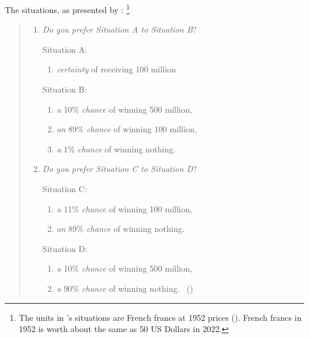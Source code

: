 \begin{note}
  The situations, as presented by \citeauthor{Allais:1979aa}:%
  \footnote{
    The units in \citeauthor{Allais:1979aa}'s situations are French francs at 1952 prices (\citeauthor[138, fn.94]{Allais:1979aa}). French francs in 1952 is worth about the same as 50 US Dollars in 2022.
  }
  \begin{quote}
    \begin{enumerate}[label=(\arabic*), ref=(\arabic*)]
    \item
      \emph{Do you prefer Situation A to Situation B}?

      Situation A:
        \begin{enumerate}[label=--]
        \item
          \emph{certainty} of receiving 100 million
        \end{enumerate}
        Situation B:
        \begin{enumerate}[label=--]
        \item
          \emph{a} 10\% \emph{chance} of winning 500 million,
        \item
          \emph{an} 89\% \emph{chance} of winning 100 million,
        \item
          \emph{a} 1\% \emph{chance} of winning nothing.
        \end{enumerate}
      \item
      \emph{Do you prefer Situation C to Situation D}?

      Situation C:
        \begin{enumerate}[label=--]
        \item
          \emph{a} 11\% \emph{chance} of winning 100 million,
        \item
          \emph{an} 89\% \emph{chance} of winning nothing.
        \end{enumerate}
        Situation D:
        \begin{enumerate}[label=--]
        \item
          \emph{a} 10\% \emph{chance} of winning 500 million,
        \item
          \emph{a} 90\% \emph{chance} of winning nothing.%
          \mbox{ }\hfill\mbox{(\citeyear[89]{Allais:1979aa})}
        \end{enumerate}
    \end{enumerate}
  \end{quote}


\end{note}
